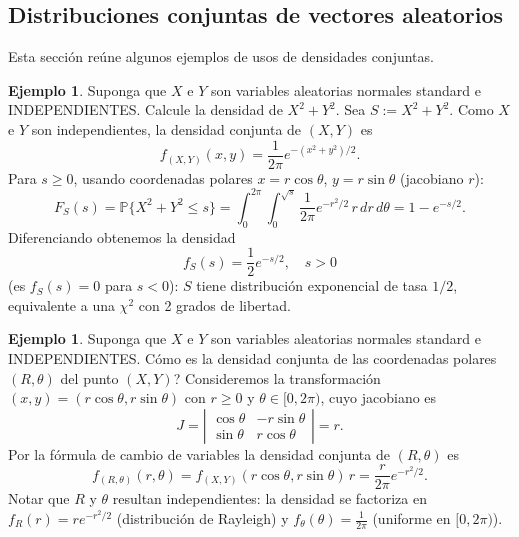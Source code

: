 \documentclass[12pt]{amsart}
\theoremstyle{definition}
\newtheorem{examplex}[lemma]{Ejemplo}
\renewcommand{\geq}{\geqslant}
\renewcommand{\leq}{\leqslant}
\newcommand{\PP}{\ensuremath{\mathbb{P}}}
\begin{document}
\subsection{Distribuciones conjuntas de vectores aleatorios}
Esta sección reúne algunos ejemplos de usos de densidades conjuntas.

\begin{examplex} Suponga que $X$ e $Y$ son variables aleatorias normales standard e INDEPENDIENTES. Calcule la densidad de $X^2+Y^2$.
Sea $S:=X^2+Y^2$. Como $X$ e $Y$ son independientes, la densidad conjunta de $(X,Y)$ es
\[f_{(X,Y)}(x,y)=\frac{1}{2\pi}e^{-(x^2+y^2)/2}.\]
Para $s\geq 0$, usando coordenadas polares $x=r\cos\theta$, $y=r\sin\theta$ (jacobiano $r$):
\[F_S(s)=\PP\{X^2+Y^2\leq s\}=\int_0^{2\pi}\int_0^{\sqrt{s}}\frac{1}{2\pi}e^{-r^2/2}\,r\,dr\,d\theta=1-e^{-s/2}.\]
Diferenciando obtenemos la densidad
\[f_S(s)=\frac{1}{2}e^{-s/2},\quad s>0\]
(es $f_S(s)=0$ para $s<0$): $S$ tiene distribución exponencial de tasa $1/2$, equivalente a una $\chi^2$ con 2 grados de libertad.
\end{examplex}

\begin{examplex} Suponga que $X$ e $Y$ son variables aleatorias normales standard e INDEPENDIENTES. Cómo es la densidad conjunta de las coordenadas polares $(R,\theta)$ del punto $(X,Y)$?
Consideremos la transformación $(x,y)=(r\cos\theta,r\sin\theta)$ con $r\geq 0$ y $\theta\in[0,2\pi)$, cuyo jacobiano es
\[J=\left|\begin{array}{cc}\cos\theta&-r\sin\theta\\ \sin\theta&r\cos\theta\end{array}\right|=r.\]
Por la fórmula de cambio de variables la densidad conjunta de $(R,\theta)$ es
\[f_{(R,\theta)}(r,\theta)=f_{(X,Y)}(r\cos\theta,r\sin\theta)\,r=\frac{r}{2\pi}e^{-r^2/2}.\]
Notar que $R$ y $\theta$ resultan independientes: la densidad se factoriza en $f_R(r)=re^{-r^2/2}$ (distribución de Rayleigh) y $f_\theta(\theta)=\frac{1}{2\pi}$ (uniforme en $[0,2\pi)$).
\end{examplex}
\end{document}
